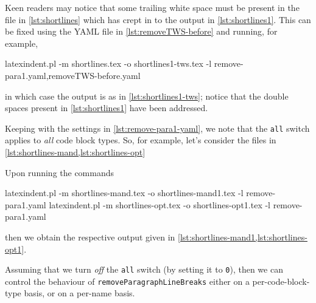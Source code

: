 	Keen readers may notice that some trailing white space must be present in the file in \cref{lst:shortlines} which
	has crept in to the output in \cref{lst:shortlines1}. This can be fixed using the YAML file in
	\vref{lst:removeTWS-before} and running, for example,
	\begin{commandshell}
latexindent.pl -m shortlines.tex -o shortlines1-tws.tex -l remove-para1.yaml,removeTWS-before.yaml  
    \end{commandshell}
	in which case the output is as in \cref{lst:shortlines1-tws}; notice that the double spaces present in \cref{lst:shortlines1}
	have been addressed.


	Keeping with the settings in \cref{lst:remove-para1-yaml}, we note that the \texttt{all} switch applies
	to \emph{all} code block types. So, for example, let's consider the files in \cref{lst:shortlines-mand,lst:shortlines-opt}

	\begin{minipage}{.45\linewidth}
	\end{minipage}
	\hfill
	\begin{minipage}{.45\linewidth}
	\end{minipage}

	Upon running the commands
	\begin{widepage}
		\begin{commandshell}
latexindent.pl -m shortlines-mand.tex -o shortlines-mand1.tex -l remove-para1.yaml
latexindent.pl -m shortlines-opt.tex -o shortlines-opt1.tex -l remove-para1.yaml
\end{commandshell}
	\end{widepage}

	then we obtain the respective output given in \cref{lst:shortlines-mand1,lst:shortlines-opt1}.


	Assuming that we turn \emph{off} the \texttt{all} switch (by setting it to \texttt{0}), then
	we can control the behaviour of \texttt{removeParagraphLineBreaks} either on a per-code-block-type basis,
	or on a per-name basis.

